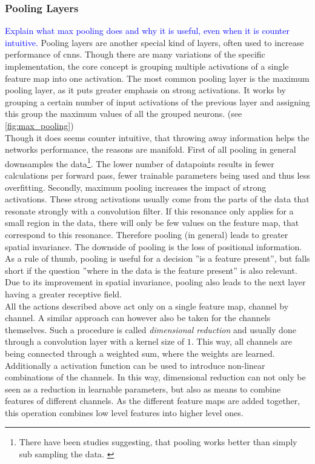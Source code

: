 \subsubsection{Pooling Layers}\label{sec:pooling_layers}
\textcolor{blue}{Explain what max pooling does and why it is useful, even when it is counter intuitive.}
Pooling layers are another special kind of layers, often used to increase performance of \gls{cnns}. Though there are many variations of the specific implementation, the core concept is grouping multiple activations of a single feature map into one activation. The most common pooling layer is the maximum pooling layer, as it puts greater emphasis on strong activations. \cite{max_pooling_invention} It works by grouping a certain number of input activations of the previous layer and assigning this group the maximum values of all the grouped neurons. (see \autoref{fig:max_pooling})\\
Though it does seems counter intuitive, that throwing away information helps the networks performance, the reasons are manifold. First of all pooling in general downsamples the data\footnote{There have been studies suggesting, that pooling works better than simply sub sampling the data. \cite{pooling_vs_subsampling}}. The lower number of datapoints results in fewer calculations per forward pass, fewer trainable parameters being used and thus less overfitting. Secondly, maximum pooling increases the impact of strong activations. These strong activations usually come from the parts of the data that resonate strongly with a convolution filter. If this resonance only applies for a small region in the data, there will only be few values on the feature map, that correspond to this resonance. Therefore pooling (in general) leads to greater spatial invariance. The downside of pooling is the loss of positional information. As a rule of thumb, pooling is useful for a decision ''is a feature present'', but falls short if the question ''where in the data is the feature present'' is also relevant.\\
Due to its improvement in spatial invariance, pooling also leads to the next layer having a greater receptive field.\medskip\\
All the actions described above act only on a single feature map, channel by channel. A similar approach can however also be taken for the channels themselves. Such a procedure is called \emph{dimensional reduction} and usually done through a convolution layer with a kernel size of $1$. This way, all channels are being connected through a weighted sum, where the weights are learned.\cite{dim_red_invention} Additionally a activation function can be used to introduce non-linear  combinations of the channels. In this way, dimensional reduction can not only be seen as a reduction in learnable parameters, but also as means to combine features of different channels. \cite{dim_red_interpretation} As the different feature maps are added together, this operation combines low level features into higher level ones.\\
